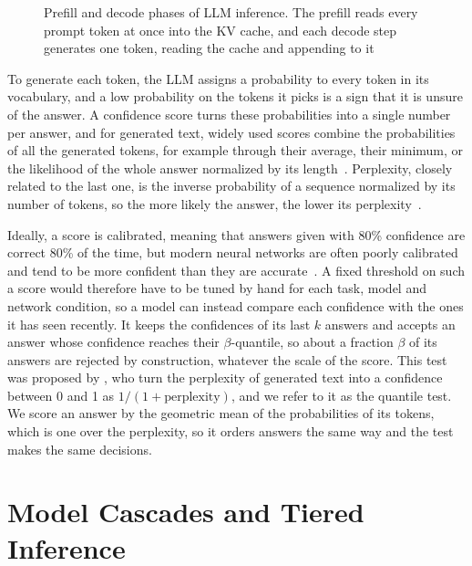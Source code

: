 \documentclass[cic,dipl,english]{infufrgs}
\begin{document}
\begin{figure}[htb]
  \centering
  \caption[Prefill and decode phases of LLM inference]{Prefill and decode phases of LLM inference.
  The prefill reads every prompt token at once into the KV cache, and each decode step generates one token, reading the cache and appending to it}
  \label{fig:prefill-decode}
  \vspace{6pt}
  
\end{figure}

To generate each token, the LLM assigns a probability to every token in its vocabulary,
and a low probability on the tokens it picks is a sign that it is unsure of the
answer. A confidence score turns these probabilities into
a single number per answer, and for generated text, widely used scores combine the
probabilities of all the generated tokens, for example through their average, their
minimum, or the likelihood of the whole answer normalized by its
length~\cite{geng2023survey}. Perplexity, closely related to the last one, is the
inverse probability of a sequence normalized by its number of tokens, so the more likely
the answer, the lower its perplexity~\cite[ch.~3]{jurafsky2026speech}.

Ideally, a score is calibrated, meaning that answers given with 80\% confidence are
correct 80\% of the time, but modern neural networks are often poorly calibrated and
tend to be more confident than they are accurate~\cite{guo2017calibration}. A fixed
threshold on such a score would therefore have to be tuned by hand for each task, model
and network condition, so a model can instead compare each confidence with the ones it
has seen recently. It keeps the confidences of its last $k$ answers and accepts an answer
whose confidence reaches their $\beta$-quantile, so about a fraction $\beta$ of its
answers are rejected by construction, whatever the scale of the score. This test was
proposed by , who turn the perplexity of generated text into a
confidence between 0 and 1 as $1/(1+\text{perplexity})$, and we refer to it as the quantile
test. We score an answer by the geometric mean of the probabilities of its tokens, which is one
over the perplexity, so it orders answers the same way and the test makes the same decisions.

\section{Model Cascades and Tiered Inference}
\label{sec:cascades-tiers}
\end{document}
